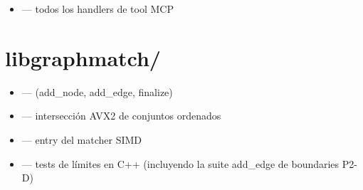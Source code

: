 \begin{itemize}\setlength{\itemsep}{0pt}
    \item {} --- todos los handlers de tool
        MCP
\end{itemize}

\section{libgraphmatch/}

\begin{itemize}\setlength{\itemsep}{0pt}
    \item {} ---
         (add\_node, add\_edge, finalize)
    \item {} --- intersección
        AVX2 de conjuntos ordenados
    \item {} --- entry del matcher SIMD
    \item {} --- tests de
        límites en C++ (incluyendo la suite add\_edge de
        boundaries P2-D)
\end{itemize}
